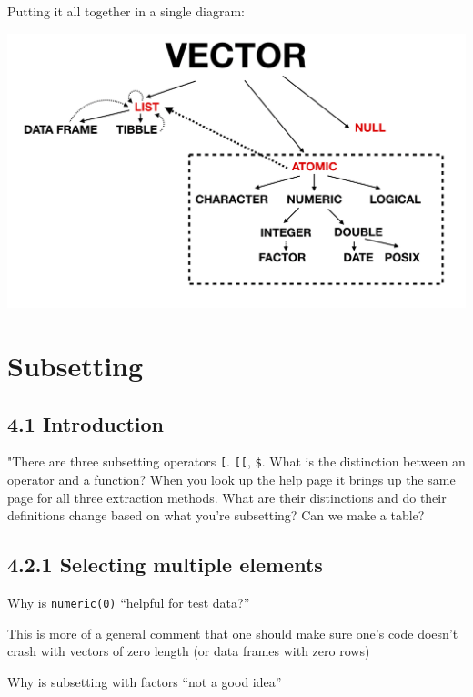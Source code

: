 \documentclass[]{book}
\begin{document}
Putting it all together in a single diagram:

\includegraphics[width=26.44in]{images/vectors}

\hypertarget{subsetting}{%
\chapter{Subsetting}\label{subsetting}}

\hypertarget{introduction}{%
\section*{4.1 Introduction}\label{introduction}}

"There are three subsetting operators \texttt{{[}}. \texttt{{[}{[}}, \texttt{\$}. What is the distinction between an operator and a function? When you look up the help page it brings up the same page for all three extraction methods. What are their distinctions and do their definitions change based on what you're subsetting? Can we make a table?

\hypertarget{selecting-multiple-elements}{%
\section*{4.2.1 Selecting multiple elements}\label{selecting-multiple-elements}}

Why is \texttt{numeric(0)} ``helpful for test data?''

This is more of a general comment that one should make sure one's code doesn't crash with vectors of zero length (or data frames with zero rows)

Why is subsetting with factors ``not a good idea''
\end{document}

